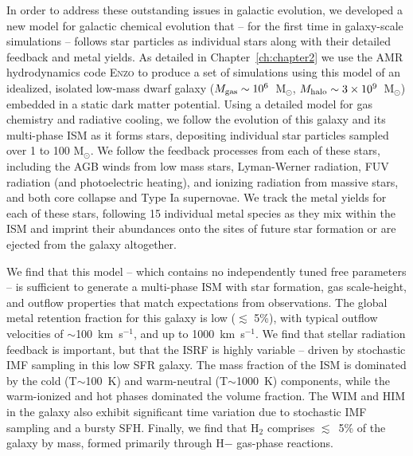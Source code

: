 In order to address these outstanding issues in galactic evolution, we developed a new model for galactic chemical evolution that -- for the first time in galaxy-scale simulations -- follows star particles as individual stars along with their detailed feedback and metal yields. As detailed in Chapter~\ref{ch:chapter2} we use the AMR hydrodynamics code \textsc{Enzo} to produce a set of simulations using this model of an idealized, isolated low-mass dwarf galaxy ($M_{\rm gas} \sim 10^{6}$~M$_{\odot}$, $M_{\rm halo} \sim 3 \times 10^{9}$~M$_{\odot}$) embedded in a static dark matter potential. Using a detailed model for gas chemistry and radiative cooling, we follow the evolution of this galaxy and its multi-phase ISM as it forms stars, depositing individual star particles sampled over 1 to 100 M$_{\odot}$. We follow the feedback processes from each of these stars, including the AGB winds from low mass stars, Lyman-Werner radiation, FUV radiation (and photoelectric heating), and ionizing radiation from massive stars, and both core collapse and Type Ia supernovae. We track the metal yields for each of these stars, following 15 individual metal species as they mix within the ISM and imprint their abundances onto the sites of future star formation or are ejected from the galaxy altogether.

We find that this model -- which contains no independently tuned free parameters -- is sufficient to generate a multi-phase ISM with star formation, gas scale-height, and outflow properties that match expectations from observations. The global metal retention fraction for this galaxy is low ($\lesssim$ 5\%), with typical outflow velocities of $\sim$100~km~s$^{-1}$, and up to 1000~km~s$^{-1}$. We find that stellar radiation feedback is important, but that the ISRF is highly variable -- driven by stochastic IMF sampling in this low SFR galaxy. The mass fraction of the ISM is dominated by the cold (T$\sim$100~K) and warm-neutral (T$\sim$1000~K) components, while the warm-ionized and hot phases dominated the volume fraction. The WIM and HIM in the galaxy also exhibit significant time variation due to stochastic IMF sampling and a bursty SFH. Finally, we find that H$_2$ comprises $\lesssim$~5\% of the galaxy by mass, formed primarily through H$-$ gas-phase reactions.

